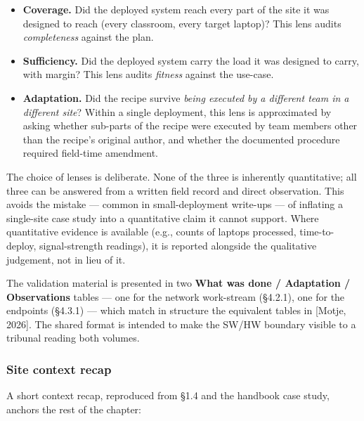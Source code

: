 \begin{itemize}
\tightlist
\item
  \textbf{Coverage.} Did the deployed system reach every part of the
  site it was designed to reach (every classroom, every target laptop)?
  This lens audits \emph{completeness} against the plan.
\item
  \textbf{Sufficiency.} Did the deployed system carry the load it was
  designed to carry, with margin? This lens audits \emph{fitness}
  against the use-case.
\item
  \textbf{Adaptation.} Did the recipe survive \emph{being executed by a
  different team in a different site}? Within a single deployment, this
  lens is approximated by asking whether sub-parts of the recipe were
  executed by team members other than the recipe's original author, and
  whether the documented procedure required field-time amendment.
\end{itemize}

The choice of lenses is deliberate. None of the three is inherently
quantitative; all three can be answered from a written field record and
direct observation. This avoids the mistake --- common in
small-deployment write-ups --- of inflating a single-site case study
into a quantitative claim it cannot support. Where quantitative evidence
is available (e.g., counts of laptops processed, time-to- deploy,
signal-strength readings), it is reported alongside the qualitative
judgement, not in lieu of it.

The validation material is presented in two \textbf{What was done /
Adaptation / Observations} tables --- one for the network work-stream
(§4.2.1), one for the endpoints (§4.3.1) --- which match in structure
the equivalent tables in {[}Motje, 2026{]}. The shared format is
intended to make the SW/HW boundary visible to a tribunal reading both
volumes.

\hypertarget{site-context-recap}{%
\subsubsection{Site context recap}\label{site-context-recap}}

A short context recap, reproduced from §1.4 and the handbook case study,
anchors the rest of the chapter:


